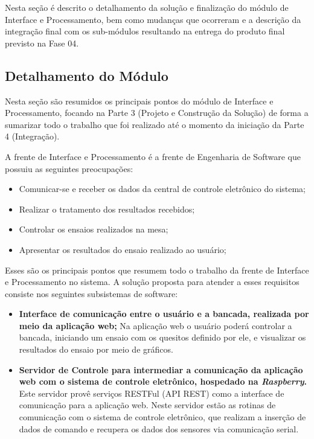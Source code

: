\label{desenvolvimento_processamento}

Nesta seção é descrito o detalhamento da solução e finalização do módulo de Interface e Processamento,
bem como mudanças que ocorreram e a descrição da integração final com os sub-módulos resultando na
entrega do produto final previsto na Fase 04.

\subsection{Detalhamento do Módulo}

Nesta seção são resumidos os principais pontos do módulo de Interface e Processamento, focando na Parte 3 (Projeto e Construção da Solução)
de forma a sumarizar todo o trabalho que foi realizado até o momento da iniciação da Parte 4 (Integração).

A frente de Interface e Processamento é a frente de Engenharia de Software que possuiu as seguintes preocupações:

\begin{itemize}
  \item Comunicar-se e receber os dados da central de controle eletrônico do sistema;
  \item Realizar o tratamento dos resultados recebidos;
  \item Controlar os ensaios realizados na mesa;
  \item Apresentar os resultados do ensaio realizado ao usuário;
\end{itemize}

Esses são os principais pontos que resumem todo o trabalho da frente de Interface e Processamento no sistema.
A solução proposta para atender a esses requisitos consiste nos seguintes subsistemas de software:

\begin{itemize}
 \item \textbf{Interface de comunicação entre o usuário e a bancada, realizada por meio da aplicação web;}
      \subitem Na aplicação web o usuário poderá controlar a bancada, iniciando um ensaio com os quesitos definido por ele,
	       e visualizar os resultados do ensaio por meio de gráficos.
 \item \textbf{Servidor de Controle para intermediar a comunicação da aplicação web com o sistema de controle eletrônico, hospedado na \textit{Raspberry}.}
      \subitem Este servidor provê serviços RESTFul (API REST) como a interface de comunicação para a aplicação web. Neste servidor estão as
	       rotinas de comunicação com o sistema de controle eletrônico, que realizam a inserção de dados de comando e recupera os dados
	       dos sensores via comunicação serial.
\end{itemize}

